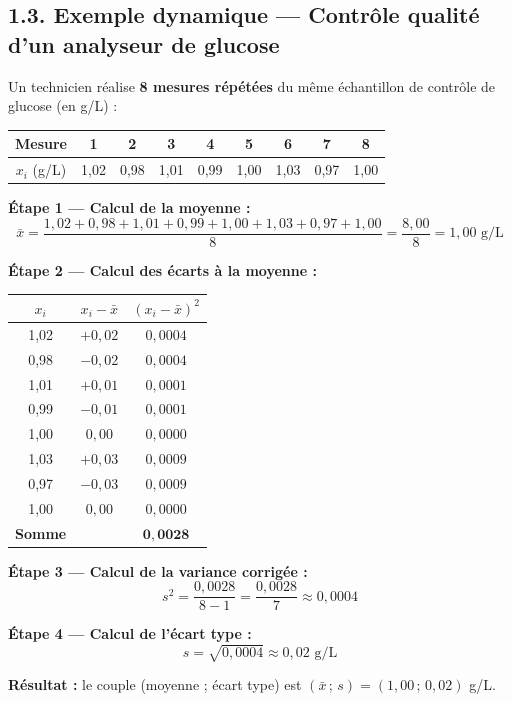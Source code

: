 \documentclass[11pt,a4paper]{article}
\begin{document}
\subsection*{1.3. Exemple dynamique — Contrôle qualité d'un analyseur de glucose}

\begin{exemple}
Un technicien réalise \textbf{8 mesures répétées} du même échantillon de contrôle de glucose (en g/L) :

\begin{center}
\begin{tabular}{|c|c|c|c|c|c|c|c|c|}
\hline
Mesure & 1 & 2 & 3 & 4 & 5 & 6 & 7 & 8 \\
\hline
$x_i$ (g/L) & 1{,}02 & 0{,}98 & 1{,}01 & 0{,}99 & 1{,}00 & 1{,}03 & 0{,}97 & 1{,}00 \\
\hline
\end{tabular}
\end{center}

\vspace{0.2cm}
\textbf{Étape 1 — Calcul de la moyenne :}
\[
\bar{x} = \frac{1{,}02 + 0{,}98 + 1{,}01 + 0{,}99 + 1{,}00 + 1{,}03 + 0{,}97 + 1{,}00}{8}
= \frac{8{,}00}{8} = 1{,}00 \text{ g/L}
\]

\textbf{Étape 2 — Calcul des écarts à la moyenne :}

\begin{center}
\begin{tabular}{|c|c|c|}
\hline
$x_i$ & $x_i - \bar{x}$ & $(x_i - \bar{x})^2$ \\
\hline
1{,}02 & $+0{,}02$ & $0{,}0004$ \\
\hline
0{,}98 & $-0{,}02$ & $0{,}0004$ \\
\hline
1{,}01 & $+0{,}01$ & $0{,}0001$ \\
\hline
0{,}99 & $-0{,}01$ & $0{,}0001$ \\
\hline
1{,}00 & $0{,}00$ & $0{,}0000$ \\
\hline
1{,}03 & $+0{,}03$ & $0{,}0009$ \\
\hline
0{,}97 & $-0{,}03$ & $0{,}0009$ \\
\hline
1{,}00 & $0{,}00$ & $0{,}0000$ \\
\hline
\textbf{Somme} & & $\mathbf{0{,}0028}$ \\
\hline
\end{tabular}
\end{center}

\textbf{Étape 3 — Calcul de la variance corrigée :}
\[
s^2 = \frac{0{,}0028}{8-1} = \frac{0{,}0028}{7} \approx 0{,}0004
\]

\textbf{Étape 4 — Calcul de l'écart type :}
\[
s = \sqrt{0{,}0004} \approx 0{,}02 \text{ g/L}
\]

\textbf{Résultat :} le couple (moyenne ; écart type) est $\boxed{(\bar{x} \,;\, s) = (1{,}00 \,;\, 0{,}02)}$ g/L.
\end{exemple}
\end{document}
